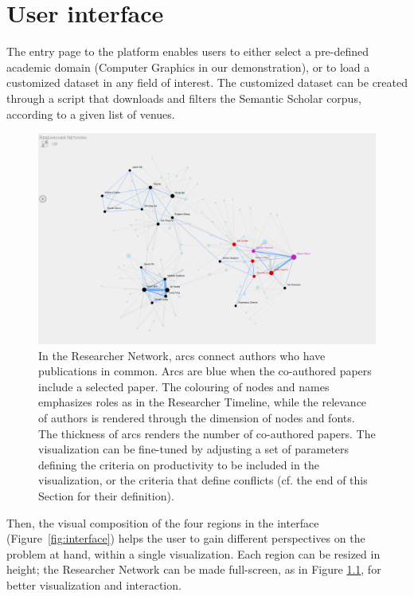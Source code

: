 \chapter{User interface}
\label{sec:userinterface}

The entry page to the platform enables users to either select a pre-defined academic domain (Computer Graphics in our demonstration), or to load a customized dataset in any field of interest. The customized dataset can be created through a script that downloads and filters the Semantic Scholar corpus, according to a given list of venues.

\begin{figure}[!t]
    \centering
    \includegraphics[width=\textwidth]{fig/researcher_network.png}
    \caption{In the Researcher Network, arcs connect authors who have publications in common.  Arcs are blue when the co-authored papers include a selected paper. The colouring of nodes and names emphasizes roles as in the Researcher Timeline, while the relevance of authors is rendered through the dimension of nodes and fonts. The thickness of arcs renders the number of co-authored papers. The visualization can be fine-tuned by adjusting a set of parameters defining the criteria on productivity to be included in the visualization, or the criteria that define conflicts (cf. the end of this Section for their definition).}%
    \label{fig:communities}
\end{figure}

Then, the visual composition of the four regions in the interface (Figure~\ref{fig:interface}) helps the user to gain different perspectives on the problem at hand, within a single visualization. Each region can be resized in height; the Researcher Network can be made full-screen, as in Figure \ref{fig:communities}, for better visualization and interaction.

